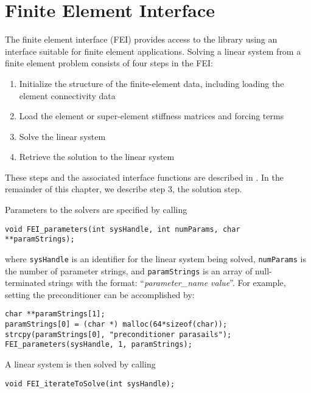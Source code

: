 \chapter{Finite Element Interface}
\label{chapter-FEI}

The finite element interface (FEI) provides access to the \hypre{}
library using an interface suitable for finite element applications.
Solving a linear system from a finite element problem consists of
four steps in the FEI:
\begin{enumerate}
\item Initialize the structure of the finite-element data,
      including loading the element connectivity data
\item Load the element or super-element stiffness matrices and forcing terms
\item Solve the linear system
\item Retrieve the solution to the linear system
\end{enumerate}

These steps and the associated
interface functions are described in \cite{FEI-ref}.
In the remainder of this chapter, we describe step 3, the solution step.

Parameters to the \hypre{} solvers are specified by calling
\begin{display}
\begin{verbatim}
void FEI_parameters(int sysHandle, int numParams, char **paramStrings);
\end{verbatim}
\end{display}
where {\tt sysHandle} is an identifier for the linear system being solved,
{\tt numParams} is the number of parameter strings, and {\tt paramStrings} is
an array of null-terminated strings with the format: 
``{\em parameter\_name value}''.
For example, setting the preconditioner can be accomplished by:
\begin{display}
\begin{verbatim}
char **paramStrings[1];
paramStrings[0] = (char *) malloc(64*sizeof(char));
strcpy(paramStrings[0], "preconditioner parasails");
FEI_parameters(sysHandle, 1, paramStrings);
\end{verbatim}
\end{display}

A linear system is then solved by calling 
\begin{display}
\begin{verbatim}
void FEI_iterateToSolve(int sysHandle);
\end{verbatim}
\end{display}

